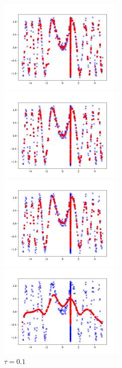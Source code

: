 \begin{answer}
    \begin{figure}[htbp]
        \centering
        \begin{minipage}[t]{0.48\textwidth}
            \centering
            \includegraphics[width=6cm]{../src/output/p05c_1.png}
            \caption{$\tau = 0.03$}
        \end{minipage}
        \begin{minipage}[t]{0.48\textwidth}
            \centering
            \includegraphics[width=6cm]{../src/output/p05c_2.png}
            \caption{$\tau = 0.05$}
        \end{minipage}
        \begin{minipage}[t]{0.48\textwidth}
            \centering
            \includegraphics[width=6cm]{../src/output/p05c_3.png}
            \caption{$\tau = 0.1$}
        \end{minipage}
        \begin{minipage}[t]{0.48\textwidth}
            \centering
            \includegraphics[width=6cm]{../src/output/p05c_4.png}

\end{minipage}
\end{figure}
\end{answer}
